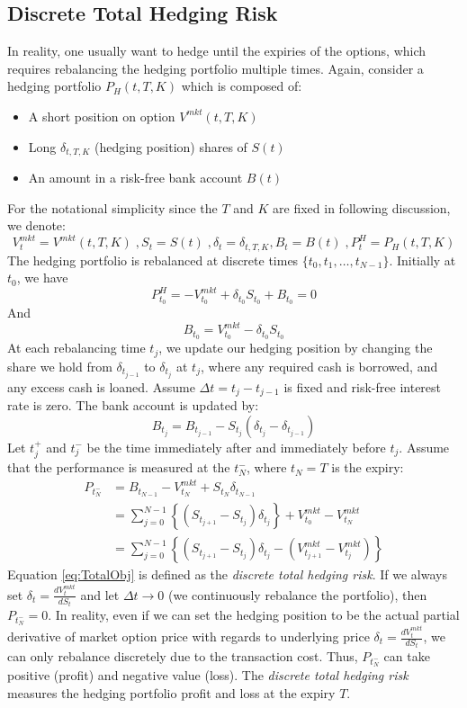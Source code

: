 \documentclass[letterpaper,12pt,titlepage,oneside,final]{book}
\numberwithin{equation}{section}
\theoremstyle{definition}
\newcommand{\Vmkt}{V^{mkt}}
\newcommand{\Smkt}{S}
\begin{document}
\subsection{Discrete Total Hedging Risk}
In reality, one usually want to hedge until the expiries of the options, which requires rebalancing the hedging portfolio multiple times. Again,
consider a hedging portfolio $P_{H}(t,T,K)$ which is composed of:
\begin{itemize}
	\item A short position on option $\Vmkt(t,T,K)$
	\item Long $\delta_{t,T,K}$ (hedging position) shares of $\Smkt(t)$
	\item An amount in a risk-free bank account $B(t)$
\end{itemize}
For the notational simplicity since the $T$ and $K$ are fixed in following discussion, we denote:
\[
    \Vmkt_{t}=\Vmkt (t,T,K)\;,\Smkt_{t}=\Smkt(t)\;,\delta_{t}=\delta_{t,T,K},B_t=B(t)\;, P^{H}_t=P_H(t,T,K)
\]
The hedging portfolio is rebalanced at discrete times $\{t_0,t_1,\dots,t_{N-1}\}$. 
Initially at $t_0$, we have
\[
P^H_{t_0}=  -V_{t_0}^{mkt}+\delta_{t_0} S_{t_0}+ B_{t_0}=0
\]
And
\[
B_{t_0}=V_{t_0}^{mkt}-\delta_{t_0} S_{t_0}
\]
At each rebalancing time $t_j$, we update our hedging position by changing the share we hold from $\delta_{t_{j-1}}$ to $\delta_{t_j}$ at $t_j$, where any required cash is borrowed, and any excess cash is loaned. Assume $\Delta t=t_{j}-t_{j-1}$ is fixed and risk-free interest rate is zero.
The bank account is updated by:
\[
B_{t_{j}}= B_{t_{j-1}}-S_{t_j}(\delta_{t_j}-\delta_{t_{j-1}})
\]
Let $t_j^+$ and $t_j^-$   be the time immediately after  and immediately before $t_j$. Assume that the performance is measured at the $t_N^-$, where $t_N=T$ is the expiry:
\begin{equation}
\begin{split}
P_{t_N^-}&=B_{t_{N-1}}- V_{t_N}^{mkt}+ S_{t_N} \delta_{t_{N-1}}  \\
&=\sum_{j=0}^{N-1}\left\{ \left(S_{t_{j+1}}-S_{t_{j}}\right) \delta_{t_j} \right\}+ V_{t_0}^{mkt}-V_{t_N}^{mkt}\\
&=\sum_{j=0}^{N-1}\left\{ \left( S_{t_{j+1}}-S_{t_{j}}\right) \delta_{t_j} -(V_{t_{j+1}}^{mkt}-V_{t_j}^{mkt}) \right\}
\end{split}
\label{eq:TotalObj}
\end{equation}
Equation \eqref{eq:TotalObj} is defined as the {\em discrete total hedging risk}.
If we always set $\delta_t=\frac{d V_t^{mkt}}{d S_t}$ and let $\Delta t \rightarrow 0$ (we continuously rebalance the portfolio), then $P_{t_N^-}=0$. In reality, even if we can set the hedging position to be the actual partial derivative of market option price with regards to underlying price $\delta_t=\frac{d V_t^{mkt}}{d S_t}$,  we can only rebalance discretely due to the transaction cost. Thus, $P_{t_N^-}$ can take positive (profit) and negative value (loss).
The  {\em discrete total hedging risk} measures the hedging portfolio profit and loss at the expiry $T$. 
\end{document}
